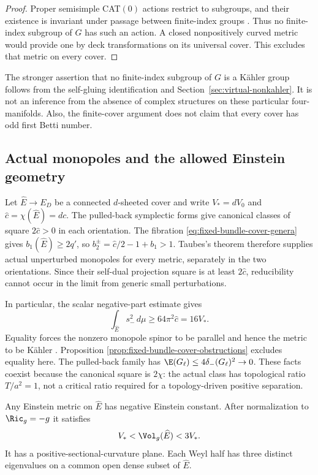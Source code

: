 \begin{proof}
Proper semisimple CAT$(0)$ actions restrict to subgroups, and their
existence is invariant under passage between finite-index groups
\cite[Theorem 2.3 and the proof of Theorem 4.5]{KapovichLeeb}.
Thus no finite-index subgroup of $G$ has such an action.  A closed
nonpositively curved metric would provide one by deck transformations
on its universal cover.  This excludes that metric on every cover.
\end{proof}

The stronger assertion that no finite-index subgroup of $G$ is a
K\"ahler group follows from the self-gluing identification and
Section~\ref{sec:virtual-nonkahler}.  It is not an inference from
the absence of complex structures on these particular four-manifolds.
Also, the finite-cover argument does not claim that every cover has
odd first Betti number.

\subsection{Actual monopoles and the allowed Einstein geometry}

Let $\widehat E\to E_D$ be a connected $d$-sheeted cover and write
$V_*=dV_0$ and $\widehat c=\chi(\widehat E)=dc$.
The pulled-back symplectic forms give canonical classes of square
$2\widehat c>0$ in each orientation.  The fibration
\eqref{eq:fixed-bundle-cover-genera} gives $b_1(\widehat E)\ge2q'$,
so $b_2^\pm=\widehat c/2-1+b_1>1$.
Taubes's theorem \cite{Taubes1994} therefore supplies actual
unperturbed monopoles for every metric, separately in the two
orientations.  Since their self-dual projection square is at least
$2\widehat c$, reducibility cannot occur in the limit from generic small
perturbations.

In particular, the scalar negative-part estimate gives
\begin{equation}\label{eq:fixed-bundle-scalar-budget}
 \int_{\widehat E}s_-^2\,d\mu\ge64\pi^2\widehat c=16V_*.
\end{equation}
Equality forces the nonzero monopole spinor to be parallel and hence
the metric to be K\"ahler \cite{LeBrun2001}.  Proposition
\ref{prop:fixed-bundle-cover-obstructions} excludes equality here.
The pulled-back family has $\E(G_\ell)\le4\delta_-(G_\ell)^2\to0$.
These facts coexist because the canonical square is $2\chi$:
the actual class has topological ratio $T/a^2=1$, not a critical
ratio required for a topology-driven positive separation.

\begin{proposition}\label{prop:fixed-bundle-einstein-window}
Any Einstein metric on $\widehat E$ has negative Einstein constant.
After normalization to $\Ric_g=-g$ it satisfies
\begin{equation}\label{eq:fixed-bundle-einstein-window}
 V_*<\Vol_g(\widehat E)<3V_*.
\end{equation}
It has a positive-sectional-curvature plane.  Each Weyl half has
three distinct eigenvalues on a common open dense subset of
$\widehat E$.
\end{proposition}

